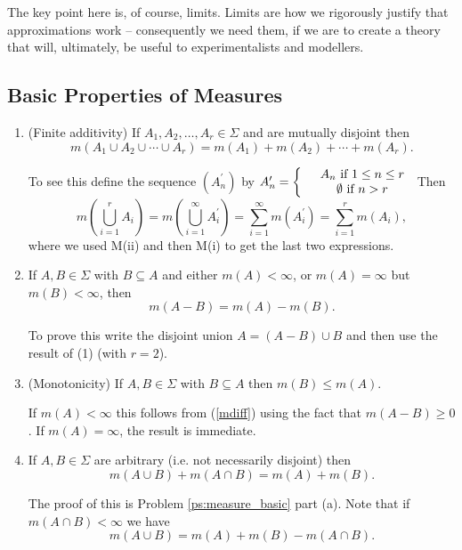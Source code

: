 \documentclass[a4paper]{report}
\numberwithin{equation}{chapter}
\numberwithin{thm_counter}{section}
\def\sw{\subseteq} %
\begin{document}
The key point here is, of course, limits. Limits are how we rigorously justify that approximations work -- consequently we need them, if we are to create a theory that will, ultimately, be useful to experimentalists and modellers.

\subsection{Basic Properties of Measures}
\label{sec:basic_meas}

\begin{enumerate}


\item (Finite additivity) If $A_{1}, A_{2}, \ldots, A_{r} \in \Sigma$ and are mutually disjoint then
$$ m(A_{1} \cup A_{2} \cup \cdots \cup A_{r}) = m(A_{1}) + m(A_{2}) + \cdots + m(A_{r}).$$

To see this define the sequence $(A_{n}^{\prime})$ by
$ A_{n}^{\prime} = \left\{ \begin{array}{c c }  & A_{n} ~\mbox{if}~1 \leq n \leq r\\
 & \emptyset ~\mbox{if}~n > r \end{array} \right.$ Then
 $$ m\left(\bigcup_{i=1}^{r}A_{i}\right) = m\left(\bigcup_{i=1}^{\infty}A_{i}^{\prime}\right) = \sum_{i=1}^{\infty}m(A_{i}^{\prime}) = \sum_{i=1}^{r}m(A_{i}),$$
 where we used M(ii) and then M(i) to get the last two expressions.

\item If $A, B \in \Sigma$ with $B\sw A$ and either $m(A) < \infty$, or $m(A) = \infty$ but $m(B) < \infty$, then
\begin{equation} \label{mdiff}
m(A-B) = m(A) - m(B).
\end{equation}

To prove this write the disjoint union $A = (A-B) \cup B$ and then use the result of (1) (with $r=2$).

\item (Monotonicity) If $A, B \in \Sigma$ with $B \subseteq A$ then $m(B) \leq m(A)$.

If $m(A) < \infty$ this follows from (\ref{mdiff}) using the fact that $m(A-B) \geq 0$. If $m(A) = \infty$, the result is immediate.

\item If $A, B \in \Sigma$ are arbitrary (i.e. not necessarily disjoint) then
\begin{equation} \label{munion}
m(A \cup B) + m(A \cap B) = m(A) + m(B).
\end{equation}

The proof of this is Problem \ref{ps:measure_basic} part (a). Note that if $m(A \cap B) < \infty$ we have
$$m(A \cup B)  = m(A) + m(B) - m(A \cap B).$$

\end{enumerate}
\end{document}
